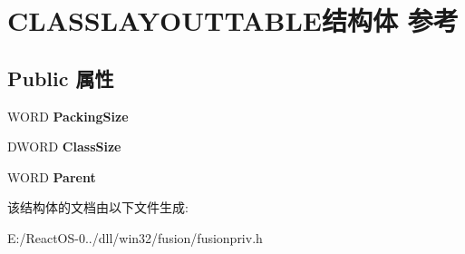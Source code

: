 \hypertarget{struct_c_l_a_s_s_l_a_y_o_u_t_t_a_b_l_e}{}\section{C\+L\+A\+S\+S\+L\+A\+Y\+O\+U\+T\+T\+A\+B\+L\+E结构体 参考}
\label{struct_c_l_a_s_s_l_a_y_o_u_t_t_a_b_l_e}
\subsection*{Public 属性}
\begin{DoxyCompactItemize}
\item 
\mbox{\label{struct_c_l_a_s_s_l_a_y_o_u_t_t_a_b_l_e_a6b39d98ef936a9b4147566238c39873b}} 
W\+O\+RD {\bfseries Packing\+Size}
\item 
\mbox{\label{struct_c_l_a_s_s_l_a_y_o_u_t_t_a_b_l_e_a179b0d9187fe7c402e19fcae1bb413c2}} 
D\+W\+O\+RD {\bfseries Class\+Size}
\item 
\mbox{\label{struct_c_l_a_s_s_l_a_y_o_u_t_t_a_b_l_e_a35561d9e1c4a803ecd54562d7a914b3b}} 
W\+O\+RD {\bfseries Parent}
\end{DoxyCompactItemize}


该结构体的文档由以下文件生成\+:\begin{DoxyCompactItemize}
\item 
E\+:/\+React\+O\+S-\/0../dll/win32/fusion/fusionpriv.\+h\end{DoxyCompactItemize}
